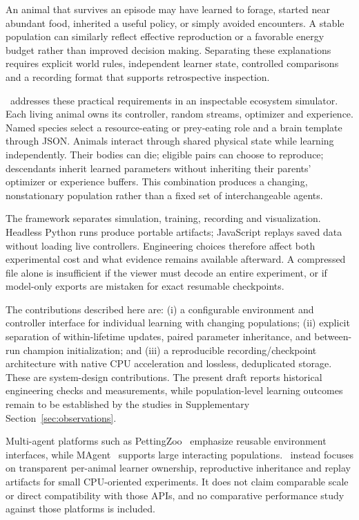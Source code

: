 An animal that survives an episode may have learned to forage, started near
abundant food, inherited a useful policy, or simply avoided encounters. A stable
population can similarly reflect effective reproduction or a favorable energy
budget rather than improved decision making. Separating these explanations
requires explicit world rules, independent learner state, controlled comparisons
and a recording format that supports retrospective inspection.

\framework\ addresses these practical requirements in an inspectable ecosystem
simulator. Each living animal owns its controller, random streams, optimizer and
experience. Named species select a resource-eating or prey-eating role and a
brain template through JSON. Animals interact through shared physical state
while learning independently. Their bodies can die; eligible pairs can choose
to reproduce; descendants inherit learned parameters without inheriting their
parents' optimizer or experience buffers. This combination produces a changing,
nonstationary population rather than a fixed set of interchangeable agents.

The framework separates simulation, training, recording and visualization.
Headless Python runs produce portable artifacts; JavaScript replays saved data
without loading live controllers. Engineering choices therefore affect both
experimental cost and what evidence remains available afterward. A compressed
file alone is insufficient if the viewer must decode an entire experiment, or
if model-only exports are mistaken for exact resumable checkpoints.

The contributions described here are: (i) a configurable environment and
controller interface for individual learning with changing populations;
(ii) explicit separation of within-lifetime updates, paired parameter
inheritance, and between-run champion initialization; and (iii) a reproducible
recording/checkpoint architecture with native CPU acceleration and lossless,
deduplicated storage. These are system-design contributions. The present draft
reports historical engineering checks and measurements, while population-level
learning outcomes remain to be established by the studies in
Supplementary Section~\ref{sec:observations}.

Multi-agent platforms such as PettingZoo~\citep{terry2021pettingzoo} emphasize
reusable environment interfaces, while MAgent~\citep{zheng2017magent} supports
large interacting populations. \framework\ instead focuses on transparent
per-animal learner ownership, reproductive inheritance and replay artifacts for
small CPU-oriented experiments. It does not claim comparable scale or direct
compatibility with those APIs, and no comparative performance study against
those platforms is included.


